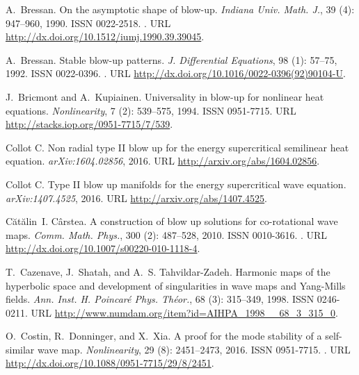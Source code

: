 \documentclass[11pt]{aims}
\theoremstyle{definition}
\numberwithin{equation}{section}
\begin{document}
\begin{thebibliography}{62}
A.~Bressan.
\newblock On the asymptotic shape of blow-up.
\newblock \emph{Indiana Univ. Math. J.}, 39 (4): 947--960,
  1990.
\newblock ISSN 0022-2518.
\newblock {}.
\newblock URL \url{http://dx.doi.org/10.1512/iumj.1990.39.39045}.

A.~Bressan.
\newblock Stable blow-up patterns.
\newblock \emph{J. Differential Equations}, 98 (1): 57--75,
  1992.
\newblock ISSN 0022-0396.
\newblock {}.
\newblock URL \url{http://dx.doi.org/10.1016/0022-0396(92)90104-U}.

J.~Bricmont and A.~Kupiainen.
\newblock Universality in blow-up for nonlinear heat equations.
\newblock \emph{Nonlinearity}, 7 (2): 539--575, 1994.
\newblock ISSN 0951-7715.
\newblock URL \url{http://stacks.iop.org/0951-7715/7/539}.

Collot C.
\newblock Non radial type {II} blow up for the energy supercritical semilinear
  heat equation.
\newblock \emph{arXiv:1604.02856}, 2016{}.
\newblock URL \url{http://arxiv.org/abs/1604.02856}.

Collot C.
\newblock Type {II} blow up manifolds for the energy supercritical wave
  equation.
\newblock \emph{arXiv:1407.4525}, 2016{}.
\newblock URL \url{http://arxiv.org/abs/1407.4525}.

C\u at\u alin~I. C\^arstea.
\newblock A construction of blow up solutions for co-rotational wave maps.
\newblock \emph{Comm. Math. Phys.}, 300 (2): 487--528, 2010.
\newblock ISSN 0010-3616.
\newblock {}.
\newblock URL \url{http://dx.doi.org/10.1007/s00220-010-1118-4}.

T.~Cazenave, J.~Shatah, and A.~S. Tahvildar-Zadeh.
\newblock Harmonic maps of the hyperbolic space and development of
  singularities in wave maps and {Y}ang-{M}ills fields.
\newblock \emph{Ann. Inst. H. Poincar\'e Phys. Th\'eor.}, 68
  (3): 315--349, 1998.
\newblock ISSN 0246-0211.
\newblock URL \url{http://www.numdam.org/item?id=AIHPA_1998__68_3_315_0}.

O.~Costin, R.~Donninger, and X.~Xia.
\newblock A proof for the mode stability of a self-similar wave map.
\newblock \emph{Nonlinearity}, 29 (8): 2451--2473, 2016.
\newblock ISSN 0951-7715.
\newblock {}.
\newblock URL \url{http://dx.doi.org/10.1088/0951-7715/29/8/2451}.


\end{thebibliography}
\end{document}
